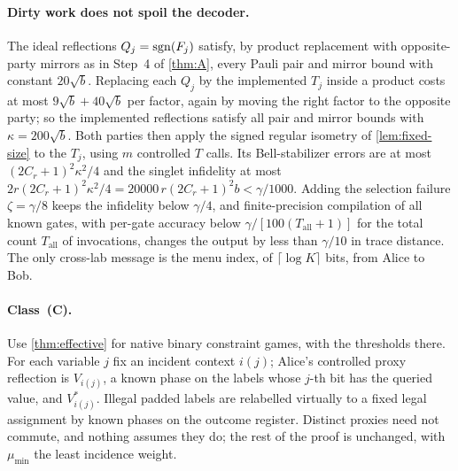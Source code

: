 \paragraph{Dirty work does not spoil the decoder.} The ideal reflections $Q_j=\operatorname{sgn}(F_j)$ satisfy, by product replacement with
opposite-party mirrors as in Step~4 of \cref{thm:A}, every Pauli pair and mirror bound with constant $20\sqrt b$. Replacing
each $Q_j$ by the implemented $T_j$ inside a product costs at most $9\sqrt b+40\sqrt b$ per factor, again by moving the
right factor to the opposite party; so the implemented reflections satisfy all pair and mirror bounds with
$\kappa=200\sqrt b$. Both parties then apply the signed regular isometry of \cref{lem:fixed-size} to the $T_j$, using
$m$ controlled $T$ calls. Its Bell-stabilizer errors are at most $(2C_r+1)^2\kappa^2/4$ and the singlet infidelity at most
$2r(2C_r+1)^2\kappa^2/4=20000\,r(2C_r+1)^2b<\gamma/1000$. Adding the selection failure $\zeta=\gamma/8$ keeps the infidelity
below $\gamma/4$, and finite-precision compilation of all known gates, with per-gate accuracy below $\gamma/[100(T_{\mathrm{all}}+1)]$
for the total count $T_{\mathrm{all}}$ of invocations, changes the output by less than $\gamma/10$ in trace distance. The only
cross-lab message is the menu index, of $\lceil\log K\rceil$ bits, from Alice to Bob.

\paragraph{Class~(C).} Use \cref{thm:effective} for native binary constraint games, with the thresholds there. For each
variable $j$ fix an incident context $i(j)$; Alice's controlled proxy reflection is $V_{i(j)}$, a known phase on the labels
whose $j$-th bit has the queried value, and $V_{i(j)}^*$. Illegal padded labels are relabelled virtually to a fixed legal
assignment by known phases on the outcome register. Distinct proxies need not commute, and nothing assumes they do; the
rest of the proof is unchanged, with $\mu_{\min}$ the least incidence weight.
